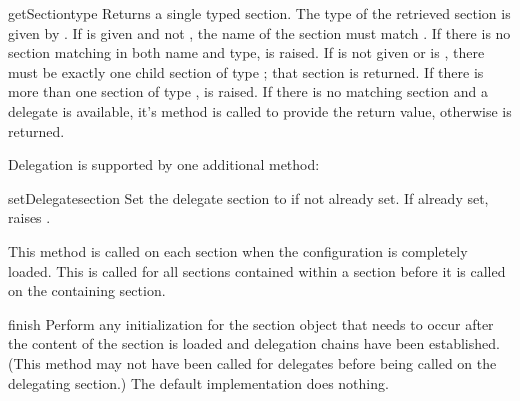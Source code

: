 \documentclass{howto}
\begin{document}
\begin{methoddesc}[Configuration]{getSection}{type}
  Returns a single typed section.  The type of the retrieved section
  is given by .  If  is given and not ,
  the name of the section must match .  If there is no
  section matching in both name and type,
   is
  raised.  If  is not given or is , there must be
  exactly one child section of type ; that section is
  returned.  If there is more than one section of type ,
   is raised.  If
  there is no matching section and a delegate is available, it's
   method is called to provide the return value,
  otherwise  is returned.
\end{methoddesc}

Delegation is supported by one additional method:

\begin{methoddesc}[Configuration]{setDelegate}{section}
  Set the delegate section to  if not already set.  If
  already set, raises .
\end{methoddesc}

This method is called on each section when the configuration is
completely loaded.  This is called for all sections contained within a
section before it is called on the containing section.

\begin{methoddesc}[Configuration]{finish}{}
  Perform any initialization for the section object that needs to
  occur after the content of the section is loaded and delegation
  chains have been established.  (This method may not have been called
  for delegates before being called on the delegating section.)  The
  default implementation does nothing.
\end{methoddesc}
\end{document}
